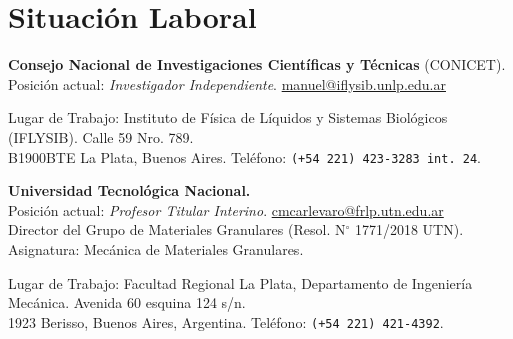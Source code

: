 \section*{Situación Laboral}

 \textbf{Consejo Nacional de Investigaciones Científicas y Técnicas} (CONICET). \\Posición actual: \textit{Investigador Independiente}. \faEnvelopeO{} \href{mailto:manuel@iflysib.unlp.edu.ar}{manuel@iflysib.unlp.edu.ar}

  Lugar de Trabajo: Instituto de Física de Líquidos y Sistemas Biológicos (IFLYSIB). Calle 59 Nro. 789.\\ B1900BTE  La Plata, Buenos Aires. Teléfono: \texttt{(+54 221) 423-3283 int. 24}.

   \textbf{Universidad Tecnológica Nacional.} \\Posición actual: \textit{Profesor Titular Interino}. \faEnvelopeO{} \href{mailto:manuel@iflysib.unlp.edu.ar}{cmcarlevaro@frlp.utn.edu.ar} \\
Director del Grupo de Materiales Granulares (Resol. N$^\circ$ 1771/2018 UTN).\\
Asignatura: Mecánica de Materiales Granulares.

Lugar de Trabajo: Facultad Regional La Plata, Departamento de Ingeniería Mecánica. Avenida 60 esquina 124 s/n. \\1923 Berisso, Buenos Aires, Argentina. Teléfono: \texttt{(+54 221) 421-4392}.

  
% 
